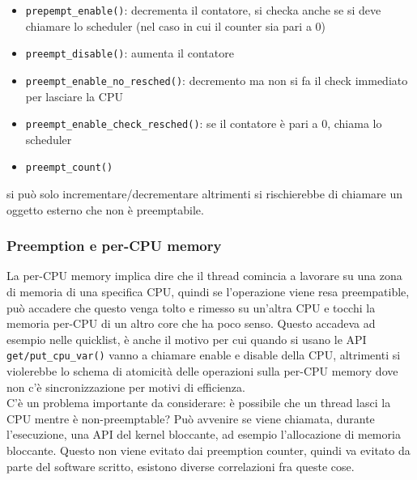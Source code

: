 \documentclass[12pt, oneside]{extbook}
\begin{document}
\begin{itemize}
\item \texttt{prepempt\_enable()}: decrementa il contatore, si checka anche se si deve chiamare lo scheduler (nel caso in cui il counter sia pari a 0)
\item \texttt{preempt\_disable()}: aumenta il contatore
\item \texttt{preempt\_enable\_no\_resched()}: decremento ma non si fa il check immediato per lasciare la CPU
\item \texttt{preempt\_enable\_check\_resched()}: se il contatore è pari a 0, chiama lo scheduler
\item  \texttt{preempt\_count()}
\end{itemize}
si può solo incrementare/decrementare altrimenti si rischierebbe di chiamare un oggetto esterno che non è preemptabile.
\subsubsection{Preemption e per-CPU memory}
La per-CPU memory implica dire che il thread comincia a lavorare su una zona di memoria di una specifica CPU, quindi se l'operazione viene resa preempatible, può accadere che questo venga tolto e rimesso su un'altra CPU e tocchi la memoria per-CPU di un altro core che ha poco senso. Questo accadeva ad esempio nelle quicklist, è anche il motivo per cui quando si usano le API \texttt{get/put\_cpu\_var()} vanno a chiamare enable e disable della CPU, altrimenti si violerebbe lo schema di atomicità delle operazioni sulla per-CPU memory dove non c'è sincronizzazione per motivi di efficienza.\\ C'è un problema importante da considerare: è possibile che un thread lasci la CPU mentre è non-preemptable? Può avvenire se viene chiamata, durante l'esecuzione, una API del kernel bloccante, ad esempio l'allocazione di memoria bloccante. Questo non viene evitato dai preemption counter, quindi va evitato da parte del software scritto, esistono diverse correlazioni fra queste cose.
\end{document}
